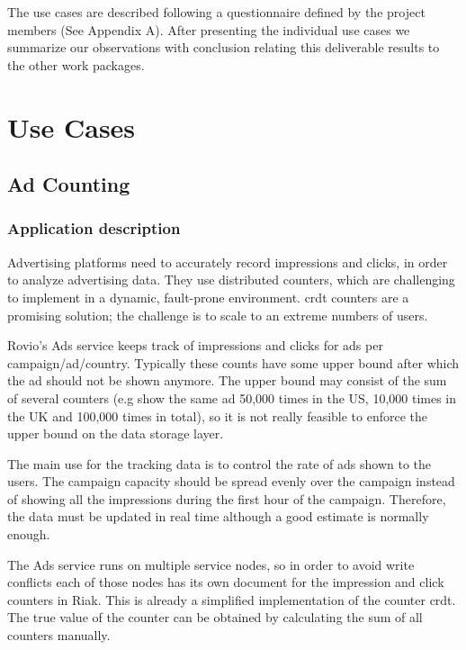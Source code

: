 \documentclass[11pt,a4paper]{report}
\begin{document}
The use cases are described following a questionnaire defined
by the project members (See Appendix A).
After presenting the individual use cases we summarize our
observations with conclusion relating this deliverable results to the
other work packages.

\chapter{Use Cases}
\section{Ad Counting}
\subsection{Application description}
Advertising platforms need to accurately record impressions and clicks, in order to analyze advertising data. They use distributed counters, which are challenging to implement in a dynamic, fault-prone environment. \gls{crdt} counters are a promising solution; the challenge is to scale to an extreme numbers of users. 
 
Rovio's Ads service keeps track of impressions and clicks for ads per campaign/ad/country. Typically these counts have some upper bound  after which the ad should not be shown anymore. The upper bound may consist of the sum of several counters (e.g show the same ad 50,000 times in the US, 10,000 times in the UK and 100,000 times in total), so it is not really feasible to enforce the upper bound on the data storage layer.

The main use for the tracking data is to control the rate of ads shown to the users. The campaign capacity should be spread evenly over the campaign instead of showing all the impressions during the first hour of the campaign. Therefore, the data must be updated in real time although a good estimate is normally enough.

The Ads service runs on multiple service nodes, so in order to avoid write conflicts each of those nodes has its own document for the impression and click counters in Riak. This is already a simplified implementation of the counter \gls{crdt}. The true value of the counter can be obtained by calculating the sum of all counters manually.
\end{document}
